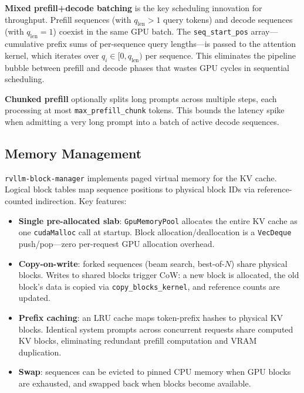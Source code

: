 \documentclass[11pt,a4paper]{article}
\begin{document}
\textbf{Mixed prefill+decode batching} is the key scheduling innovation for
throughput. Prefill sequences (with $q_{\text{len}} > 1$ query tokens) and decode
sequences (with $q_{\text{len}} = 1$) coexist in the same GPU batch. The
\texttt{seq\_start\_pos} array---cumulative prefix sums of per-sequence query
lengths---is passed to the attention kernel, which iterates over
$q_i \in [0, q_{\text{len}})$ per sequence. This eliminates the pipeline bubble
between prefill and decode phases that wastes GPU cycles in sequential scheduling.

\textbf{Chunked prefill} optionally splits long prompts across multiple steps,
each processing at most \texttt{max\_prefill\_chunk} tokens. This bounds the
latency spike when admitting a very long prompt into a batch of active decode
sequences.

\subsection{Memory Management}

\texttt{rvllm-block-manager} implements paged virtual memory for the KV cache.
Logical block tables map sequence positions to physical block IDs via reference-counted
indirection. Key features:

\begin{itemize}
  \item \textbf{Single pre-allocated slab}: \texttt{GpuMemoryPool} allocates the
        entire KV cache as one \texttt{cudaMalloc} call at startup. Block
        allocation/deallocation is a \texttt{VecDeque} push/pop---zero per-request
        GPU allocation overhead.
  \item \textbf{Copy-on-write}: forked sequences (beam search, best-of-$N$) share
        physical blocks. Writes to shared blocks trigger CoW: a new block is allocated,
        the old block's data is copied via \texttt{copy\_blocks\_kernel}, and reference
        counts are updated.
  \item \textbf{Prefix caching}: an LRU cache maps token-prefix hashes to physical
        KV blocks. Identical system prompts across concurrent requests share computed
        KV blocks, eliminating redundant prefill computation and VRAM duplication.
  \item \textbf{Swap}: sequences can be evicted to pinned CPU memory when GPU blocks
        are exhausted, and swapped back when blocks become available.
\end{itemize}
\end{document}
